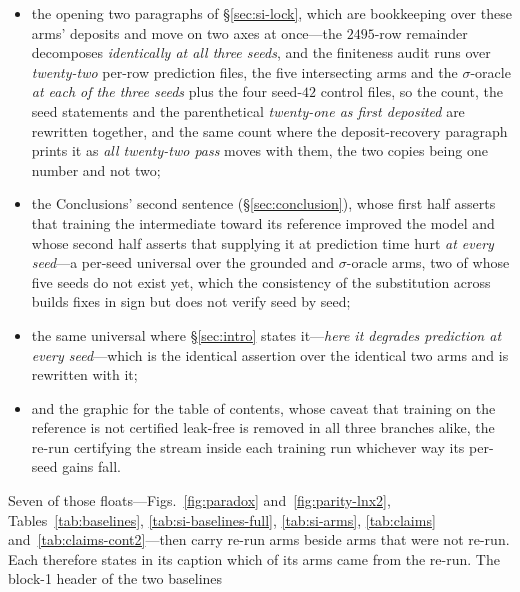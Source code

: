 \begin{itemize}[leftmargin=1.15em,labelsep=0.4em,topsep=3pt,itemsep=2pt,parsep=0pt,partopsep=0pt]
finite-prediction clause removes no row from any arm \emph{at any seed}, and, in
\S\ref{sec:si-repro}, the compute ledger's \emph{(three seeds)} and the seeds-and-determinism
paragraph's \emph{$\{42,43,44\}$}, which is a second printed seed list for the same three arms, and
in \S\ref{sec:si-methods} the substitution-perturbation paragraph's \emph{over the three seeds},
whose three maxima are taken across the same arms;
\item the opening two paragraphs of \S\ref{sec:si-lock}, which are bookkeeping over these arms' deposits
and move on two axes at
once---the $2495$-row remainder decomposes \emph{identically at all three seeds}, and the finiteness
audit runs over \emph{twenty-two} per-row prediction files, the five intersecting arms and the
$\sigma$-oracle \emph{at each of the three seeds} plus the four seed-$42$ control files, so the
count, the seed statements and the parenthetical \emph{twenty-one as first deposited} are rewritten
together, and the same count where the deposit-recovery paragraph prints it as \emph{all
twenty-two pass} moves with them, the two copies being one number and not two;
\item the Conclusions' second sentence (\S\ref{sec:conclusion}), whose first half asserts that training the
intermediate toward its reference improved the model and whose second half asserts that supplying it
at prediction time hurt \emph{at every seed}---a per-seed universal over the grounded and
$\sigma$-oracle arms, two of whose five seeds do not exist yet, which the consistency of the
substitution across builds fixes in sign but does not verify seed by seed;
\item the same universal where \S\ref{sec:intro} states it---\emph{here it degrades prediction at every
seed}---which is the identical assertion over the identical two arms and is rewritten with it;
\item and the graphic for the table of contents, whose caveat that training on the
reference is not certified leak-free is removed in all three branches alike, the re-run certifying
the stream inside each training run whichever way its per-seed gains fall.
\end{itemize}
Seven of those floats---Figs.~\ref{fig:paradox} and~\ref{fig:parity-lnx2},
Tables~\ref{tab:baselines}, \ref{tab:si-baselines-full}, \ref{tab:si-arms}, \ref{tab:claims}
and~\ref{tab:claims-cont2}---then carry re-run arms beside arms that were not
re-run. Each therefore states
in its caption which of its arms came from the re-run. The block-1 header of the two baselines
